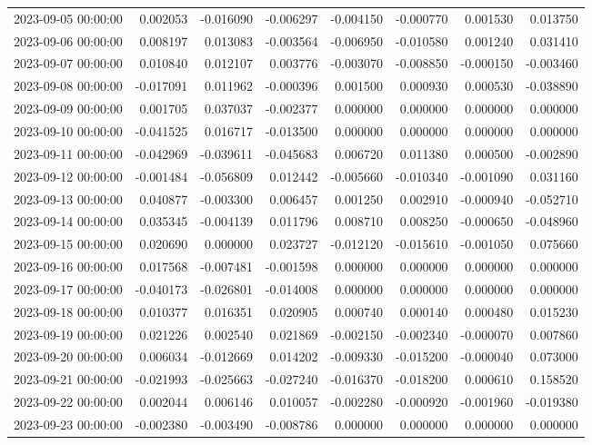 \begin{tabular}{lrrrrrrr}
2023-09-05 00:00:00 & 0.002053 & -0.016090 & -0.006297 & -0.004150 & -0.000770 & 0.001530 & 0.013750 \\
2023-09-06 00:00:00 & 0.008197 & 0.013083 & -0.003564 & -0.006950 & -0.010580 & 0.001240 & 0.031410 \\
2023-09-07 00:00:00 & 0.010840 & 0.012107 & 0.003776 & -0.003070 & -0.008850 & -0.000150 & -0.003460 \\
2023-09-08 00:00:00 & -0.017091 & 0.011962 & -0.000396 & 0.001500 & 0.000930 & 0.000530 & -0.038890 \\
2023-09-09 00:00:00 & 0.001705 & 0.037037 & -0.002377 & 0.000000 & 0.000000 & 0.000000 & 0.000000 \\
2023-09-10 00:00:00 & -0.041525 & 0.016717 & -0.013500 & 0.000000 & 0.000000 & 0.000000 & 0.000000 \\
2023-09-11 00:00:00 & -0.042969 & -0.039611 & -0.045683 & 0.006720 & 0.011380 & 0.000500 & -0.002890 \\
2023-09-12 00:00:00 & -0.001484 & -0.056809 & 0.012442 & -0.005660 & -0.010340 & -0.001090 & 0.031160 \\
2023-09-13 00:00:00 & 0.040877 & -0.003300 & 0.006457 & 0.001250 & 0.002910 & -0.000940 & -0.052710 \\
2023-09-14 00:00:00 & 0.035345 & -0.004139 & 0.011796 & 0.008710 & 0.008250 & -0.000650 & -0.048960 \\
2023-09-15 00:00:00 & 0.020690 & 0.000000 & 0.023727 & -0.012120 & -0.015610 & -0.001050 & 0.075660 \\
2023-09-16 00:00:00 & 0.017568 & -0.007481 & -0.001598 & 0.000000 & 0.000000 & 0.000000 & 0.000000 \\
2023-09-17 00:00:00 & -0.040173 & -0.026801 & -0.014008 & 0.000000 & 0.000000 & 0.000000 & 0.000000 \\
2023-09-18 00:00:00 & 0.010377 & 0.016351 & 0.020905 & 0.000740 & 0.000140 & 0.000480 & 0.015230 \\
2023-09-19 00:00:00 & 0.021226 & 0.002540 & 0.021869 & -0.002150 & -0.002340 & -0.000070 & 0.007860 \\
2023-09-20 00:00:00 & 0.006034 & -0.012669 & 0.014202 & -0.009330 & -0.015200 & -0.000040 & 0.073000 \\
2023-09-21 00:00:00 & -0.021993 & -0.025663 & -0.027240 & -0.016370 & -0.018200 & 0.000610 & 0.158520 \\
2023-09-22 00:00:00 & 0.002044 & 0.006146 & 0.010057 & -0.002280 & -0.000920 & -0.001960 & -0.019380 \\
2023-09-23 00:00:00 & -0.002380 & -0.003490 & -0.008786 & 0.000000 & 0.000000 & 0.000000 & 0.000000 \\

\end{tabular}
